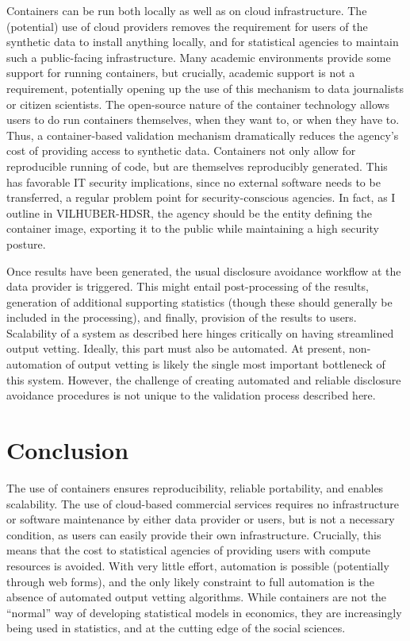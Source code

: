 \documentclass[12pt]{article}
\begin{document}
Containers can be run both locally as well as on cloud infrastructure. The (potential) use of cloud providers removes the requirement for users of the synthetic data to install anything locally, and for statistical agencies to maintain such a public-facing infrastructure. Many academic environments provide some support for running containers, but crucially, academic support is not a requirement, potentially opening up the use of this mechanism to data journalists or citizen scientists. The open-source nature of the container technology allows users to do run containers themselves, when they want to, or when they have to. Thus, a container-based validation mechanism  dramatically reduces the agency's cost of providing access to synthetic data.
%
Containers not only allow for reproducible running of code, but are themselves reproducibly generated. This has favorable IT security implications, since no external software needs to be transferred, a regular problem point for security-conscious agencies. In fact, as I outline in VILHUBER-HDSR, the agency should be the entity defining the container image, exporting it to the public while maintaining a high security posture.


Once results have been generated, the usual disclosure avoidance workflow at the data provider is triggered. This might entail post-processing of the results, generation of additional supporting statistics (though these should generally be included in the processing), and finally, provision of the results to users. 
%
Scalability of a system as described here hinges critically on having streamlined output vetting. Ideally, this  part must also be automated. At present, non-automation of output vetting is likely the single most important bottleneck of this system. However, the challenge of creating automated and reliable disclosure avoidance procedures is  not unique to the validation process described here.


\section{Conclusion}

The use of containers ensures reproducibility, reliable portability, and enables scalability. The use of cloud-based commercial services requires no infrastructure or software maintenance by either data provider or users, but is not a necessary condition, as users can easily provide their own infrastructure. Crucially, this means that the cost to statistical agencies of providing users with compute resources is avoided. With very little effort, automation is possible (potentially through web forms), and the only likely constraint to full automation is the absence of automated output vetting algorithms. While containers are not the ``normal'' way of developing statistical models in economics, they are increasingly being used in statistics, and at the cutting edge of the social sciences. 
\end{document}

